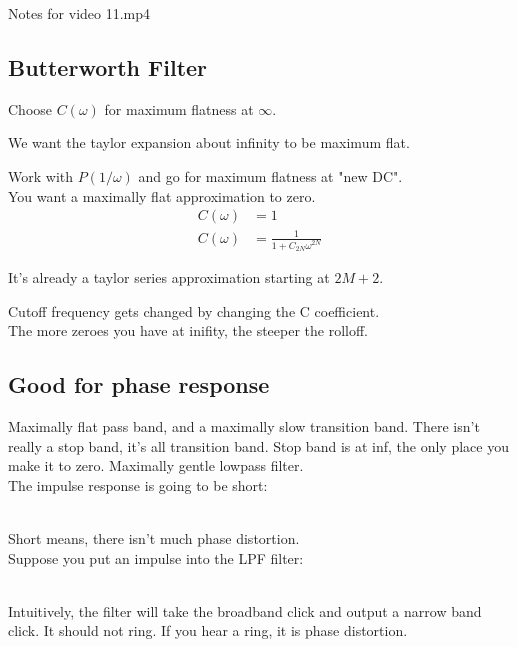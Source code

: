 Notes for video 11.mp4
\subsection*{Butterworth Filter}

Choose $C(\omega)$ for maximum flatness at $\infty$.

We want the taylor expansion about infinity to be maximum flat. 

Work with $P(1/\omega)$ and go for maximum flatness at "new DC". \\
You want a maximally flat approximation to zero. 
\begin{align*}
C(\omega) &= 1 \\
C(\omega) &= \frac{1}{1 + C_{2N}\omega^{2N}}
\end{align*}



It's already a taylor series approximation starting at $2M + 2$.

Cutoff frequency gets changed by changing the C coefficient. \\

The more zeroes you have at inifity, the steeper the rolloff.  \\

\subsection*{Good for phase response}



Maximally flat pass band, and a maximally slow transition band. There
isn't really a stop band, it's all transition band. Stop band is at inf, the
only place you make it to zero. Maximally gentle lowpass filter.  \\

The impulse response is going to be short:

 \\

Short means, there isn't much phase distortion. \\

Suppose you put an impulse into the LPF filter: 

 \\

Intuitively, the filter will take the broadband click and output a narrow
band click. It should not ring. If you hear a ring, it is phase distortion. 

